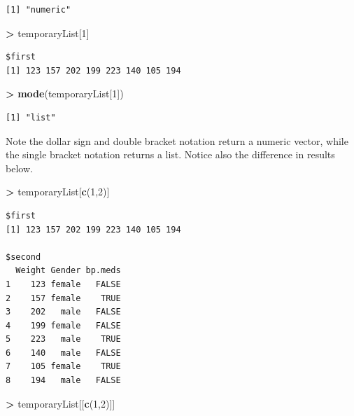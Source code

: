\documentclass[
]{krantz}
\makeatletter
\newenvironment{Shaded}{\begin{snugshade}}{\end{snugshade}}
\newcommand{\DecValTok}[1]{\textcolor[rgb]{0.06,0.06,0.06}{#1}}
\newcommand{\KeywordTok}[1]{\textcolor[rgb]{0.27,0.27,0.27}{\textbf{#1}}}
\newcommand{\NormalTok}[1]{#1}
\newcommand{\OperatorTok}[1]{\textcolor[rgb]{0.43,0.43,0.43}{\textbf{#1}}}
\newcommand{\StringTok}[1]{\textcolor[rgb]{0.5,0.5,0.5}{#1}}
\newenvironment{kframe}{%
\medskip{}
\setlength{\fboxsep}{.8em}
 \def\at@end@of@kframe{}%
 \ifinner\ifhmode%
  \def\at@end@of@kframe{\end{minipage}}%
  \begin{minipage}{\columnwidth}%
 \fi\fi%
 \def\FrameCommand##1{\hskip\@totalleftmargin \hskip-\fboxsep
 \colorbox{shadecolor}{##1}\hskip-\fboxsep
     \hskip-\linewidth \hskip-\@totalleftmargin \hskip\columnwidth}%
 \MakeFramed {\advance\hsize-\width
   \@totalleftmargin\z@ \linewidth\hsize
   \@setminipage}}%
 {\par\unskip\endMakeFramed%
 \at@end@of@kframe}
\renewenvironment{Shaded}{\begin{kframe}}{\end{kframe}}
\makeatother
\begin{document}
\begin{verbatim}
[1] "numeric"
\end{verbatim}

\begin{Shaded}
\begin{Highlighting}[]
\OperatorTok{\textgreater{}}\StringTok{ }\NormalTok{temporaryList[}\DecValTok{1}\NormalTok{]}
\end{Highlighting}
\end{Shaded}

\begin{verbatim}
$first
[1] 123 157 202 199 223 140 105 194
\end{verbatim}

\begin{Shaded}
\begin{Highlighting}[]
\OperatorTok{\textgreater{}}\StringTok{ }\KeywordTok{mode}\NormalTok{(temporaryList[}\DecValTok{1}\NormalTok{])}
\end{Highlighting}
\end{Shaded}

\begin{verbatim}
[1] "list"
\end{verbatim}

Note the dollar sign and double bracket notation return a numeric vector, while the single bracket notation returns a list. Notice also the difference in results below.

\begin{Shaded}
\begin{Highlighting}[]
\OperatorTok{\textgreater{}}\StringTok{ }\NormalTok{temporaryList[}\KeywordTok{c}\NormalTok{(}\DecValTok{1}\NormalTok{,}\DecValTok{2}\NormalTok{)]}
\end{Highlighting}
\end{Shaded}

\begin{verbatim}
$first
[1] 123 157 202 199 223 140 105 194

$second
  Weight Gender bp.meds
1    123 female   FALSE
2    157 female    TRUE
3    202   male   FALSE
4    199 female   FALSE
5    223   male    TRUE
6    140   male   FALSE
7    105 female    TRUE
8    194   male   FALSE
\end{verbatim}

\begin{Shaded}
\begin{Highlighting}[]
\OperatorTok{\textgreater{}}\StringTok{ }\NormalTok{temporaryList[[}\KeywordTok{c}\NormalTok{(}\DecValTok{1}\NormalTok{,}\DecValTok{2}\NormalTok{)]]}
\end{Highlighting}
\end{Shaded}
\end{document}
